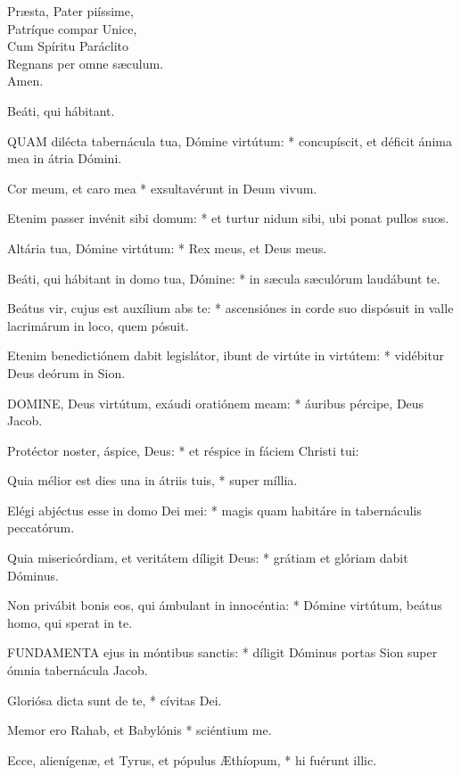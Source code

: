 Præsta, Pater piíssime,\\
Patríque compar Unice,\\
Cum Spíritu Paráclito\\
Regnans per omne sæculum.\\
Amen.

 Beáti, qui hábitant.


\lettrine[lines=2]{Q}{UAM} dilécta tabernácula tua, Dómine virtútum: * concupíscit, et déficit ánima mea in átria Dómini.

Cor meum, et caro mea * exsultavérunt in Deum vivum.

Etenim passer invénit sibi domum: * et turtur nidum sibi, ubi ponat pullos suos.

Altária tua, Dómine virtútum: * Rex meus, et Deus meus.

Beáti, qui hábitant in domo tua, Dómine: * in sæcula sæculórum laudábunt te.

Beátus vir, cujus est auxílium abs te: * ascensiónes in corde suo dispósuit in valle lacrimárum in loco, quem pósuit.

Etenim benedictiónem dabit legislátor, ibunt de virtúte in virtútem: * vidébitur Deus deórum in Sion.


\lettrine[lines=2]{D}{OMINE}, Deus virtútum, exáudi oratiónem meam: * áuribus pércipe, Deus Jacob.

Protéctor noster, áspice, Deus: * et réspice in fáciem Christi tui:

Quia mélior est dies una in átriis tuis, * super míllia.

Elégi abjéctus esse in domo Dei mei: * magis quam habitáre in tabernáculis peccatórum.

Quia misericórdiam, et veritátem díligit Deus: * grátiam et glóriam dabit Dóminus.

Non privábit bonis eos, qui ámbulant in innocéntia: * Dómine virtútum, beátus homo, qui sperat in te.


\lettrine[lines=2]{F}{UNDAMENTA} ejus in móntibus sanctis: * díligit Dóminus portas Sion super ómnia tabernácula Jacob.

Gloriósa dicta sunt de te, * cívitas Dei.

Memor ero Rahab, et Babylónis * sciéntium me.

Ecce, alienígenæ, et Tyrus, et pópulus Æthíopum, * hi fuérunt illic.

